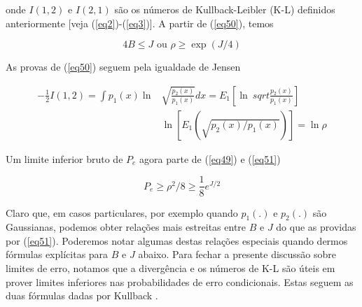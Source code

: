 \documentclass{sbrt2017port}
\begin{document}
onde $I(1,2)$ e $I(2,1)$ são os números de Kullback-Leibler (K-L) definidos anteriormente [veja (\ref{eq2})-(\ref{eq3})]. A partir de (\ref{eq50}), temos

\begin{equation}
	4B \leq J \text{ ou } \rho \geq \exp({J/4})
	\label{eq51}
\end{equation}

As provas de (\ref{eq50}) seguem pela igualdade de Jensen

\begin{equation*}
	\begin{split}
		- \frac{1}{2}I(1,2) = \int p_1(x) \ln & \sqrt{\frac{p_2(x)}{p_1(x)}}dx = E_1 [ \ln\ sqrt{\frac{p_2(x)}{p_1(x)}} ] \\
		& \ln [E_1(\sqrt{p_2(x)/p_1(x)})] = \ln \rho
	\end{split}
\end{equation*}

Um limite inferior bruto de $P_e$ agora parte de (\ref{eq49}) e (\ref{eq51})

\begin{equation}
	P_e \geq \rho^2/8 \geq \frac{1}{8} e^{J/2}
	\label{eq52}
\end{equation}

Claro que, em casos particulares, por exemplo quando $p_1(.)$ e $p_2(.)$ são Gaussianas, podemos obter relações mais estreitas entre $B$ e $J$ do que as providas por (\ref{eq51}). Poderemos notar algumas destas relações especiais quando dermos fórmulas explícitas para $B$ e $J$ abaixo. Para fechar a presente discussão sobre limites de erro, notamos que a divergência e os números de K-L são úteis em prover limites inferiores nas probabilidades de erro condicionais. Estas seguem as duas fórmulas dadas por Kullback \cite{r8}.
\end{document}
